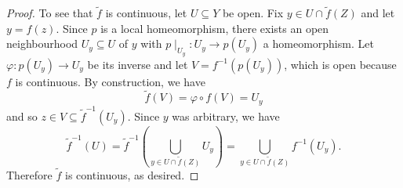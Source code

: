 \documentclass[10pt]{amsart}
\begin{document}
\begin{thm}
\begin{proof}
    To see that $\tilde{f}$ is continuous, let $U \subseteq Y$ be open.
    Fix $y \in U \cap \tilde{f}(Z)$ and let $y = f(z)$.
    Since $p$ is a local homeomorphism, there exists an open neighbourhood $U_y \subseteq U$ of $y$ with $p\mid_{U_y} \colon U_y \rightarrow p(U_y)$ a homeomorphism.
    Let $\varphi \colon p(U_y) \rightarrow U_y$ be its inverse and let $V = f^{-1}(p(U_y))$, which is open because $f$ is continuous.
    By construction, we have
    $$\tilde{f}(V) = \varphi \circ f(V) = U_y$$
    and so $z \in V \subseteq \tilde{f}^{-1}(U_y)$.
    Since $y$ was arbitrary, we have 
    $$\tilde{f}^{-1}(U) = \tilde{f}^{-1}\left(\bigcup_{y \in U \cap \tilde{f}(Z)} U_y\right) = \bigcup_{y \in U \cap \tilde{f}(Z)} f^{-1}(U_y).$$
    Therefore $\tilde{f}$ is continuous, as desired.
    
  \end{proof}
\end{thm}
\end{document}
